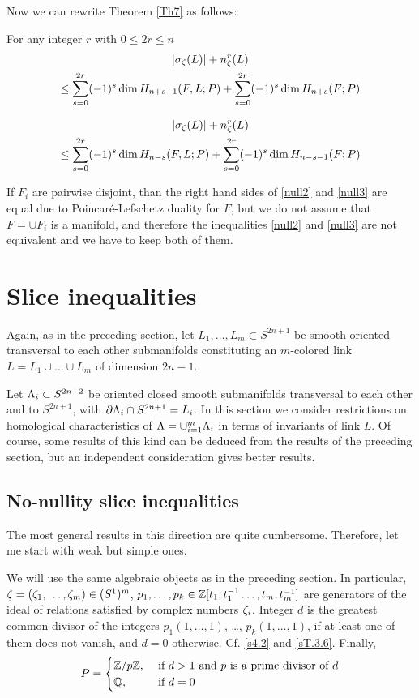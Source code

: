 \documentclass{article}
\numberwithin{equation}{section}
\begin{document}
Now we can rewrite Theorem \ref{Th7} as follows:

\begin{Th}\label{Th8} For any integer $r$ with $0\le 2r\le n$
\begin{multline}\label{null2}
|\sigma_{\zeta}(L)|+n^r_\zeta(L)
 \\  \le \sum_{s=0}^{2r}(-1)^s\dim H_{n+s+1}(F,L;P)
 +\sum_{s=0}^{2r}(-1)^s\dim H_{n+s}(F;P)
\end{multline}

\begin{multline}\label{null3}
|\sigma_{\zeta}(L)|+n^r_\zeta(L)
 \\  \le \sum_{s=0}^{2r}(-1)^s\dim H_{n-s}(F,L;P)
 +\sum_{s=0}^{2r}(-1)^s\dim H_{n-s-1}(F;P)
\end{multline}
\end{Th}

If $F_i$ are pairwise disjoint, than the right hand sides of \eqref{null2}
and \eqref{null3} are equal due to Poincar\'{e}-Lefschetz duality
for $F$, but we do not assume that $F=\cup F_i$ is a manifold, and
therefore the inequalities \eqref{null2} and \eqref{null3} are not
equivalent and we have to keep both of them. 




\section{Slice inequalities}\label{s5} 
Again, as in the preceding section, let $L_1,\dots, L_m\subset S^{2n+1}$ 
be smooth  oriented transversal to each other submanifolds
constituting an $m$-colored link $L=L_1\cup\dots\cup L_m$ of 
dimension $2n-1$. 

Let $\Lambda_i\subset S^{2n+2}$ be oriented closed smooth submanifolds 
transversal to each other and to $S^{2n+1}$, 
with $\partial \Lambda_i\cap S^{2n+1}=L_i$. In this section we consider restrictions
on homological characteristics of $\Lambda=\cup_{i=1}^m\Lambda_i$ in terms of 
invariants of link $L$. Of course, some results of this kind can be deduced
from the results of the preceding section, but an independent consideration
gives better results.

\subsection{No-nullity slice inequalities}\label{s5.1}
The most general results in this direction are quite cumbersome. 
Therefore, let me start with weak but simple ones.

We will use the same algebraic objects as in the preceding
section. In particular, $\zeta=(\zeta_1,\dots,\zeta_m)\in (S^1)^m$,
 $p_1,\dots,p_k\in\mathbb Z[t_1,t_1^{-1}\dots,t_m,t_m^{-1}]$ are
generators of the ideal of relations 
satisfied by complex numbers $\zeta_i$. Integer $d$ is the
greatest common divisor of the integers 
$p_1(1,\dots,1)$, \dots, $p_k(1,\dots,1)$, if at least one of them
does not vanish, and $d=0$ otherwise. Cf. \ref{s4.2} and \ref{sT.3.6}. 
Finally, 
$$
P=\begin{cases} \mathbb Z/p\mathbb Z, &\text{ if }d>1\text{ and }p\text{ is a prime
divisor of }d\\
\mathbb Q, &\text{ if }d=0 
\end{cases}
$$
\end{document}
